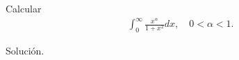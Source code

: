 \begin{homeworkProblem}
  Calcular
  \begin{align*}
    \int_{0}^{\infty}\frac{x^{\alpha}}{1+x^2}dx,\quad 0<\alpha<1.
  \end{align*}
  \begin{solution}
    Solución. 
  \end{solution}
\end{homeworkProblem}
